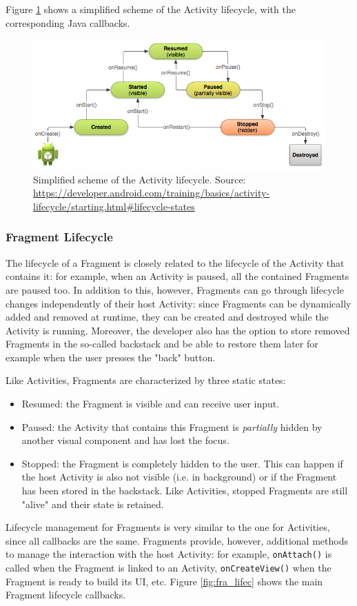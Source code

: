 \documentclass[11pt,a4paper,notitlepage]{article}
\begin{document}
Figure \ref{fig:act_lifec} shows a simplified scheme of the Activity lifecycle, with the corresponding Java callbacks.
\begin{figure}
  \centering
  \includegraphics[width=\textwidth]{Images/Android/basic-lifecycle.png}
  \caption[Activity Lifecycle]{Simplified scheme of the Activity lifecycle. Source: \url{https://developer.android.com/training/basics/activity-lifecycle/starting.html\#lifecycle-states}}
  \label{fig:act_lifec}
\end{figure}

\subsubsection{Fragment Lifecycle}
The lifecycle of a Fragment is closely related to the lifecycle of the Activity that contains it: for example, when an Activity is paused, all the contained Fragments are paused too. In addition to this, however, Fragments can go through lifecycle changes independently of their host Activity: since Fragments can be dynamically added and removed at runtime, they can be created and destroyed while the Activity is running. Moreover, the developer also has the option to store removed Fragments in the so-called backstack and be able to restore them later for example when the user presses the "back" button.

Like Activities, Fragments are characterized by three static states:
\begin{itemize}
	\item Resumed: the Fragment is visible and can receive user input.
	\item Paused: the Activity that contains this Fragment is \textit{partially} hidden by another visual component and has lost the focus.
	\item Stopped: the Fragment is completely hidden to the user. This can happen if the host Activity is also not visible (i.e. in background) or if the Fragment has been stored in the backstack. Like Activities, stopped Fragments are still "alive" and their state is retained.
\end{itemize}
Lifecycle management for Fragments is very similar to the one for Activities, since all callbacks are the same. Fragments provide, however, additional methods to manage the interaction with the host Activity: for example, \texttt{onAttach()} is called when the Fragment is linked to an Activity, \texttt{onCreateView()} when the Fragment is ready to build its UI, etc. Figure \ref{fig:fra_lifec} shows the main Fragment lifecycle callbacks.
\end{document}
